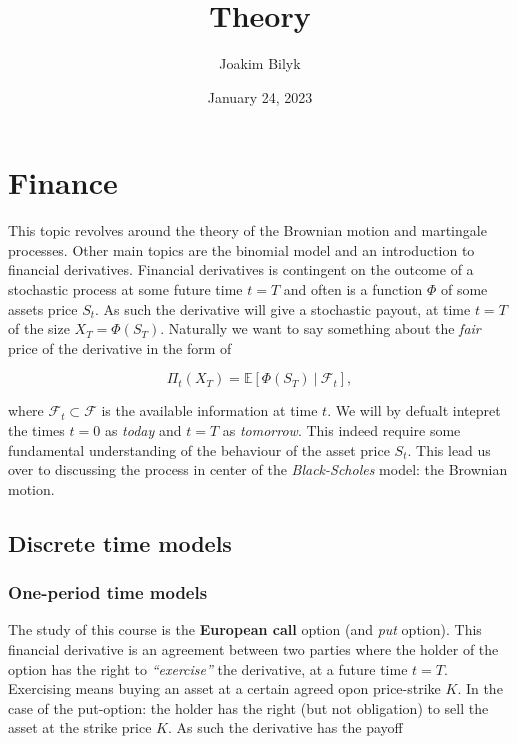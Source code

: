 \documentclass[
]{article}
\title{Theory}
\author{Joakim Bilyk}
\date{January 24, 2023\newpage}
\begin{document}
\maketitle

{
\setcounter{tocdepth}{4}
\tableofcontents
}
\thispagestyle{empty}
\newpage
\setcounter{page}{1}
\pagestyle{fancy}

\hypertarget{finance}{%
\section{Finance}\label{finance}}

This topic revolves around the theory of the Brownian motion and
martingale processes. Other main topics are the binomial model and an
introduction to financial derivatives. Financial derivatives is
contingent on the outcome of a stochastic process at some future time
\(t=T\) and often is a function \(\Phi\) of some assets price \(S_t\).
As such the derivative will give a stochastic payout, at time \(t=T\) of
the size \(X_T=\Phi(S_T)\). Naturally we want to say something about the
\emph{fair} price of the derivative in the form of

\[\Pi_t(X_T)=\mathbb{E}\left[\Phi(S_T)\ \vert\ \mathcal{F}_t\right],\]

where \(\mathcal{F}_t\subset\mathcal{F}\) is the available information
at time \(t\). We will by defualt intepret the times \(t=0\) as
\emph{today} and \(t=T\) as \emph{tomorrow}. This indeed require some
fundamental understanding of the behaviour of the asset price \(S_t\).
This lead us over to discussing the process in center of the
\emph{Black-Scholes} model: the Brownian motion.

\hypertarget{discrete-time-models}{%
\subsection{Discrete time models}\label{discrete-time-models}}

\hypertarget{one-period-time-models}{%
\subsubsection{One-period time models}\label{one-period-time-models}}

The study of this course is the \textbf{European call} option (and
\emph{put} option). This financial derivative is an agreement between
two parties where the holder of the option has the right to
\emph{``exercise''} the derivative, at a future time \(t=T\). Exercising
means buying an asset at a certain agreed opon price-strike \(K\). In
the case of the put-option: the holder has the right (but not
obligation) to sell the asset at the strike price \(K\). As such the
derivative has the payoff
\end{document}
